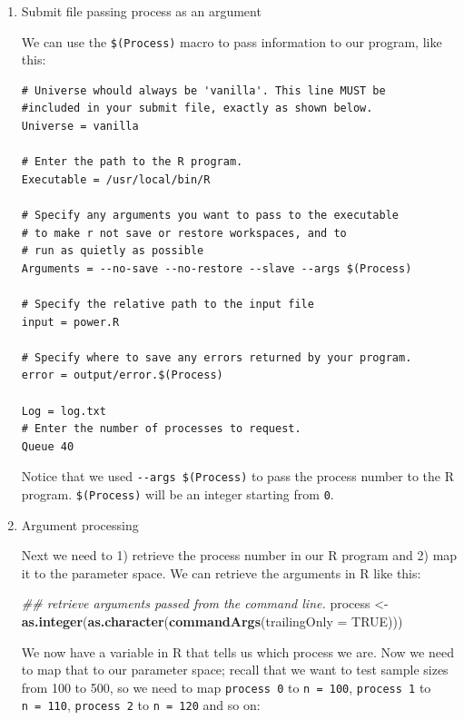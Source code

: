 \documentclass[
]{book}
\newenvironment{Shaded}{\begin{snugshade}}{\end{snugshade}}
\newcommand{\CommentTok}[1]{\textcolor[rgb]{0.56,0.35,0.01}{\textit{#1}}}
\newcommand{\DataTypeTok}[1]{\textcolor[rgb]{0.13,0.29,0.53}{#1}}
\newcommand{\KeywordTok}[1]{\textcolor[rgb]{0.13,0.29,0.53}{\textbf{#1}}}
\newcommand{\NormalTok}[1]{#1}
\newcommand{\OtherTok}[1]{\textcolor[rgb]{0.56,0.35,0.01}{#1}}
\newcommand{\StringTok}[1]{\textcolor[rgb]{0.31,0.60,0.02}{#1}}
\begin{document}
\begin{enumerate}
\def\labelenumi{\arabic{enumi}.}
\item
  Submit file passing process as an argument

  We can use the \texttt{\$(Process)} macro to pass information to our
  program, like this:

\begin{verbatim}
# Universe whould always be 'vanilla'. This line MUST be
#included in your submit file, exactly as shown below.
Universe = vanilla

# Enter the path to the R program.
Executable = /usr/local/bin/R

# Specify any arguments you want to pass to the executable
# to make r not save or restore workspaces, and to
# run as quietly as possible
Arguments = --no-save --no-restore --slave --args $(Process)

# Specify the relative path to the input file
input = power.R

# Specify where to save any errors returned by your program.
error = output/error.$(Process)

Log = log.txt
# Enter the number of processes to request.
Queue 40
\end{verbatim}

  Notice that we used \texttt{-\/-args\ \$(Process)} to pass the process number
  to the R program. \texttt{\$(Process)} will be an integer starting from \texttt{0}.
\item
  Argument processing

  Next we need to 1) retrieve the process number in our R program
  and 2) map it to the parameter space. We can retrieve the arguments
  in R like this:

\begin{Shaded}
\begin{Highlighting}[]
\CommentTok{\#\# retrieve arguments passed from the command line.}
\NormalTok{process \textless{}{-}}\StringTok{ }\KeywordTok{as.integer}\NormalTok{(}\KeywordTok{as.character}\NormalTok{(}\KeywordTok{commandArgs}\NormalTok{(}\DataTypeTok{trailingOnly =} \OtherTok{TRUE}\NormalTok{)))}
\end{Highlighting}
\end{Shaded}

  We now have a variable in R that tells us which process we are. Now
  we need to map that to our parameter space; recall that we want to
  test sample sizes from 100 to 500, so we need to map \texttt{process\ 0} to
  \texttt{n\ =\ 100}, \texttt{process\ 1} to \texttt{n\ =\ 110}, \texttt{process\ 2} to \texttt{n\ =\ 120} and so
  on:


\end{enumerate}
\end{document}
